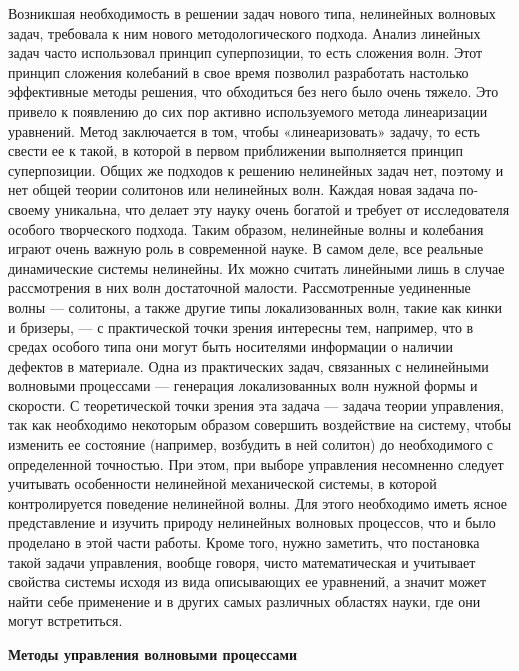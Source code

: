 Возникшая необходимость в решении задач нового типа, нелинейных волновых задач, требовала к ним нового методологического подхода. Анализ линейных задач часто использовал принцип суперпозиции, то есть сложения волн. Этот принцип сложения колебаний в свое время позволил разработать настолько эффективные методы решения, что обходиться без него было очень тяжело. Это привело к появлению до сих пор активно используемого метода линеаризации \cite{marsden1994mathematical} уравнений. Метод заключается в том, чтобы «линеаризовать» задачу, то есть свести ее к такой, в которой в первом приближении выполняется принцип суперпозиции. Общих же подходов к решению нелинейных задач нет, поэтому и нет общей теории солитонов или нелинейных волн. Каждая новая задача по-своему уникальна, что делает эту науку очень богатой и требует от исследователя особого творческого подхода.
Таким образом, нелинейные волны и колебания играют очень важную роль в современной науке. В самом деле, все реальные динамические системы нелинейны. Их можно считать линейными лишь в случае рассмотрения в них волн достаточной малости. Рассмотренные уединенные волны — солитоны, а также другие типы локализованных волн, такие как кинки и бризеры, --- с практической точки зрения интересны тем, например, что в средах особого типа они могут быть носителями информации о наличии дефектов в материале. Одна из практических задач, связанных с нелинейными волновыми процессами --- генерация локализованных волн нужной формы и скорости. С теоретической точки зрения эта задача — задача теории управления, так как необходимо некоторым образом совершить воздействие на систему, чтобы изменить ее состояние (например, возбудить в ней солитон) до необходимого с определенной точностью. При этом, при выборе управления несомненно следует учитывать особенности нелинейной механической системы, в которой контролируется поведение нелинейной волны. Для этого необходимо иметь ясное представление и изучить природу нелинейных волновых процессов, что и было проделано в этой части работы. Кроме того, нужно заметить, что постановка такой задачи управления, вообще говоря, чисто математическая и учитывает свойства системы исходя из вида описывающих ее уравнений, а значит может найти себе применение и в других самых различных областях науки, где они могут встретиться.

\textbf{Методы управления волновыми процессами}

